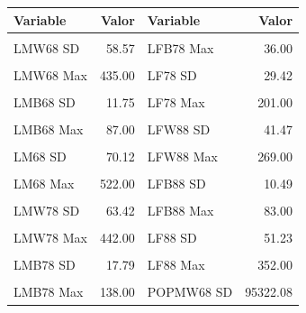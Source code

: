 \documentclass[
  12pt,
]{article}
\begin{document}
\begin{longtable}{lrlr}
\toprule
Variable & Valor & Variable & Valor\\
\midrule
\cellcolor{gray!10}{LMW68 Media} & \cellcolor{gray!10}{26.88} & \cellcolor{gray!10}{LFB78 Min} & \cellcolor{gray!10}{0.00}\\
LMW68 SD & 58.57 & LFB78 Max & 36.00\\
\cellcolor{gray!10}{LMW68 Min} & \cellcolor{gray!10}{1.00} & \cellcolor{gray!10}{LF78 Media} & \cellcolor{gray!10}{13.78}\\
LMW68 Max & 435.00 & LF78 SD & 29.42\\
\cellcolor{gray!10}{LMB68 Media} & \cellcolor{gray!10}{3.26} & \cellcolor{gray!10}{LF78 Min} & \cellcolor{gray!10}{0.00}\\
\addlinespace
LMB68 SD & 11.75 & LF78 Max & 201.00\\
\cellcolor{gray!10}{LMB68 Min} & \cellcolor{gray!10}{0.00} & \cellcolor{gray!10}{LFW88 Media} & \cellcolor{gray!10}{22.33}\\
LMB68 Max & 87.00 & LFW88 SD & 41.47\\
\cellcolor{gray!10}{LM68 Media} & \cellcolor{gray!10}{30.14} & \cellcolor{gray!10}{LFW88 Min} & \cellcolor{gray!10}{0.00}\\
LM68 SD & 70.12 & LFW88 Max & 269.00\\
\addlinespace
\cellcolor{gray!10}{LM68 Min} & \cellcolor{gray!10}{1.00} & \cellcolor{gray!10}{LFB88 Media} & \cellcolor{gray!10}{2.60}\\
LM68 Max & 522.00 & LFB88 SD & 10.49\\
\cellcolor{gray!10}{LMW78 Media} & \cellcolor{gray!10}{35.82} & \cellcolor{gray!10}{LFB88 Min} & \cellcolor{gray!10}{0.00}\\
LMW78 SD & 63.42 & LFB88 Max & 83.00\\
\cellcolor{gray!10}{LMW78 Min} & \cellcolor{gray!10}{3.00} & \cellcolor{gray!10}{LF88 Media} & \cellcolor{gray!10}{24.93}\\
\addlinespace
LMW78 Max & 442.00 & LF88 SD & 51.23\\
\cellcolor{gray!10}{LMB78 Media} & \cellcolor{gray!10}{5.01} & \cellcolor{gray!10}{LF88 Min} & \cellcolor{gray!10}{1.00}\\
LMB78 SD & 17.79 & LF88 Max & 352.00\\
\cellcolor{gray!10}{LMB78 Min} & \cellcolor{gray!10}{0.00} & \cellcolor{gray!10}{POPMW68 Media} & \cellcolor{gray!10}{52983.82}\\
LMB78 Max & 138.00 & POPMW68 SD & 95322.08\\

\end{longtable}
\end{document}
